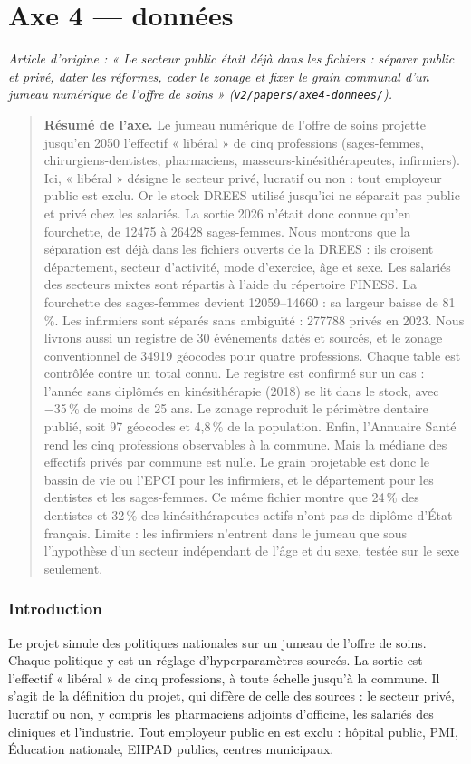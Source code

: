 \part{Axe 4 --- données}
\noindent\textit{Article d'origine : « Le secteur public était déjà dans les fichiers : séparer public et privé, dater les réformes, coder le zonage et fixer le grain communal d'un jumeau numérique de l'offre de soins » (\texttt{v2/papers/axe4-donnees/}).}

\begin{quote}\small\textbf{Résumé de l'axe.} Le jumeau numérique de l'offre de soins projette jusqu'en 2050 l'effectif « libéral » de cinq professions
(sages-femmes, chirurgiens-dentistes, pharmaciens, masseurs-kinésithérapeutes, infirmiers). Ici, « libéral »
désigne le secteur privé, lucratif ou non : tout employeur public est exclu. Or le stock DREES utilisé jusqu'ici
ne séparait pas public et privé chez les salariés. La sortie 2026 n'était donc connue qu'en fourchette, de
\num{12475} à \num{26428} sages-femmes. Nous montrons que la séparation est déjà dans les fichiers ouverts de la
DREES : ils croisent département, secteur d'activité, mode d'exercice, âge et sexe. Les salariés des secteurs
mixtes sont répartis à l'aide du répertoire FINESS. La fourchette des sages-femmes devient
\num{12059}--\num{14660}\mesure{} : sa largeur baisse de 81\,\%\derive{}. Les infirmiers sont séparés sans
ambiguïté : \num{277788} privés en 2023\mesure{}. Nous livrons aussi un registre de 30 événements datés et
sourcés, et le zonage conventionnel de \num{34919} géocodes pour quatre professions. Chaque table est contrôlée
contre un total connu. Le registre est confirmé sur un cas : l'année sans diplômés en kinésithérapie (2018) se
lit dans le stock, avec \num{-35}\,\% de moins de 25 ans\mesure{}. Le zonage reproduit le périmètre dentaire
publié, soit 97 géocodes et 4,8\,\% de la population\mesure{}. Enfin, l'Annuaire Santé rend les cinq
professions observables à la commune. Mais la médiane des effectifs privés par commune est nulle. Le grain
projetable est donc le bassin de vie ou l'EPCI pour les infirmiers, et le département pour les dentistes et les
sages-femmes. Ce même fichier montre que 24\,\% des dentistes et 32\,\% des kinésithérapeutes actifs n'ont pas
de diplôme d'État français\mesure{}. Limite : les infirmiers n'entrent dans le jumeau que sous l'hypothèse d'un
secteur indépendant de l'âge et du sexe, testée sur le sexe seulement.\end{quote}

\section{Introduction}
Le projet simule des politiques nationales sur un jumeau de l'offre de soins. Chaque politique y est un
réglage d'hyperparamètres sourcés. La sortie est l'effectif « libéral » de cinq professions, à toute échelle
jusqu'à la commune. Il s'agit de la définition du projet, qui diffère de celle des sources : le secteur privé,
lucratif ou non, y compris les pharmaciens adjoints d'officine, les salariés des cliniques et l'industrie. Tout
employeur public en est exclu : hôpital public, PMI, Éducation nationale, EHPAD publics, centres municipaux.

